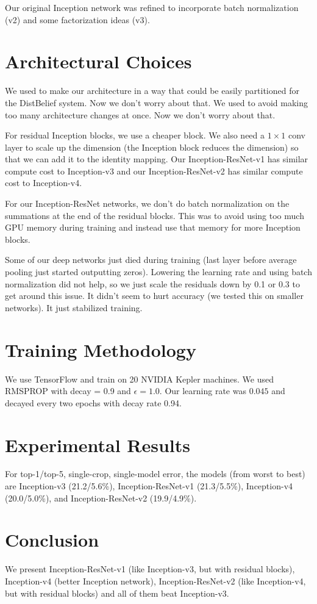 \documentclass[a4paper]{article}
\begin{document}
Our original Inception network was refined to incorporate batch normalization
(v2) and some factorization ideas (v3).

\section{Architectural Choices}
We used to make our architecture in a way that could be easily partitioned for
the DistBelief system. Now we don't worry about that. We used to avoid making
too many architecture changes at once. Now we don't worry about that.

For residual Inception blocks, we use a cheaper block. We also need a $1 \times
1$ conv layer to scale up the dimension (the Inception block reduces the
dimension) so that we can add it to the identity mapping. Our
Inception-ResNet-v1 has similar compute cost to Inception-v3 and our
Inception-ResNet-v2 has similar compute cost to Inception-v4.

For our Inception-ResNet networks, we don't do batch normalization on the
summations at the end of the residual blocks. This was to avoid using too much
GPU memory during training and instead use that memory for more Inception
blocks.

Some of our deep networks just died during training (last layer before
average pooling just started outputting zeros). Lowering the learning rate
and using batch normalization did not help, so we just scale the residuals
down by 0.1 or 0.3 to get around this issue. It didn't seem to hurt accuracy
(we tested this on smaller networks). It just stabilized training.

\section{Training Methodology}
We use TensorFlow and train on 20 NVIDIA Kepler machines. We used RMSPROP
with decay = 0.9 and $\epsilon = 1.0$. Our learning rate was $0.045$ and
decayed every two epochs with decay rate 0.94.

\section{Experimental Results}
For top-1/top-5, single-crop, single-model error, the models (from worst to
best) are Inception-v3 (21.2/5.6\%), Inception-ResNet-v1 (21.3/5.5\%),
Inception-v4 (20.0/5.0\%), and Inception-ResNet-v2 (19.9/4.9\%).

\section{Conclusion}
We present Inception-ResNet-v1 (like Inception-v3, but with residual blocks),
Inception-v4 (better Inception network), Inception-ResNet-v2 (like Inception-v4,
but with residual blocks) and all of them beat Inception-v3.
\end{document}
